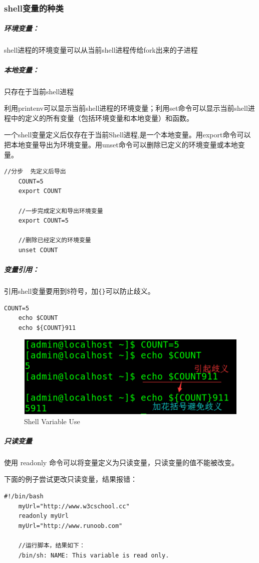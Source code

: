 \documentclass[UTF8,a4paper,12pt]{ctexbook}
\begin{document}
			 \subsubsection{shell变量的种类}
				 \subparagraph{环境变量：}shell进程的环境变量可以从当前shell进程传给fork出来的子进程
				 \subparagraph{本地变量：}只存在于当前shell进程
				 
				 利用printenv可以显示当前shell进程的环境变量；利用set命令可以显示当前shell进程中的定义的所有变量（包括环境变量和本地变量）和函数。
				 
				 一个shell变量定义后仅存在于当前Shell进程,是一个本地变量。用export命令可以把本地变量导出为环境变量。用unset命令可以删除已定义的环境变量或本地变量。
					 \begin{lstlisting}[frame=L,xleftmargin=.06\textwidth]
	//分步  先定义后导出
	COUNT=5
	export COUNT
	
	//一步完成定义和导出环境变量
	export COUNT=5 
	
	//删除已经定义的环境变量
	unset COUNT
					 \end{lstlisting}
				
				\subparagraph{变量引用：}引用shell变量要用到\$符号，加\verb|{}|可以防止歧义。
					\begin{lstlisting}[frame=L,xleftmargin=.06\textwidth]
	COUNT=5
	echo $COUNT
	echo ${COUNT}911
					\end{lstlisting}
				
					\begin{figure}[h]
						\centering
						\includegraphics[scale = 0.7]{ShellRefVariable.png}
						\caption{Shell Variable Use}
					\end{figure}
				\subparagraph{只读变量}
					使用 readonly 命令可以将变量定义为只读变量，只读变量的值不能被改变。
					
					下面的例子尝试更改只读变量，结果报错：
					\begin{lstlisting}[frame=L,xleftmargin=.06\textwidth]
	#!/bin/bash
	myUrl="http://www.w3cschool.cc"
	readonly myUrl
	myUrl="http://www.runoob.com"
	
	//运行脚本，结果如下：
	/bin/sh: NAME: This variable is read only.
					\end{lstlisting}
					
\end{document}
